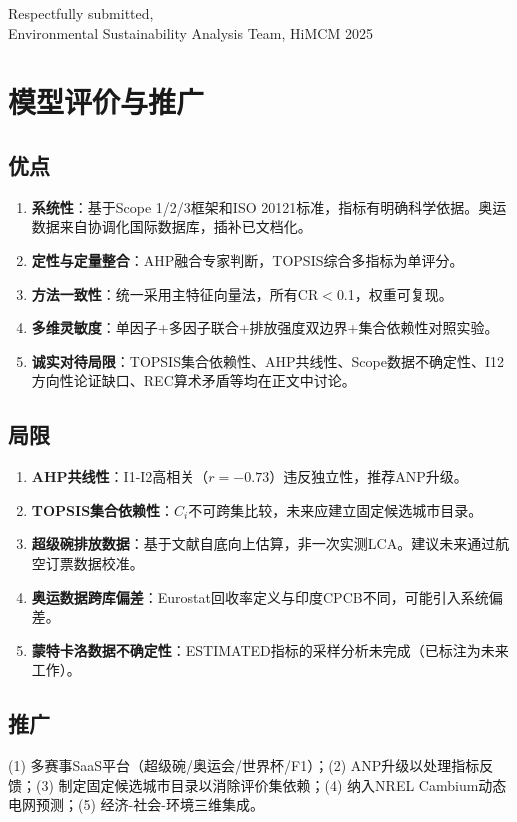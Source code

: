 \documentclass[12pt]{ctexart}
\begin{document}
\vspace{0.8em}
\noindent Respectfully submitted,\\[1em]
\noindent Environmental Sustainability Analysis Team, HiMCM 2025

\section{模型评价与推广}\label{sec:evaluation}

\subsection{优点}
\begin{enumerate}[itemsep=0.2em]
  \item \textbf{系统性}：基于Scope 1/2/3框架和ISO 20121标准\cite{ISO20121}，指标有明确科学依据。奥运数据来自协调化国际数据库，插补已文档化。
  \item \textbf{定性与定量整合}：AHP融合专家判断，TOPSIS综合多指标为单评分。
  \item \textbf{方法一致性}：统一采用主特征向量法，所有CR$<$0.1，权重可复现。
  \item \textbf{多维灵敏度}：单因子+多因子联合+排放强度双边界+集合依赖性对照实验。
  \item \textbf{诚实对待局限}：TOPSIS集合依赖性、AHP共线性、Scope数据不确定性、I12方向性论证缺口、REC算术矛盾等均在正文中讨论。
\end{enumerate}

\subsection{局限}
\begin{enumerate}[itemsep=0.2em]
  \item \textbf{AHP共线性}：I1-I2高相关（$r=-0.73$）违反独立性，推荐ANP升级\cite{Saaty}。
  \item \textbf{TOPSIS集合依赖性}：$C_i$不可跨集比较，未来应建立固定候选城市目录。
  \item \textbf{超级碗排放数据}：基于文献自底向上估算，非一次实测LCA。建议未来通过航空订票数据校准。
  \item \textbf{奥运数据跨库偏差}：Eurostat回收率定义与印度CPCB不同，可能引入系统偏差。
  \item \textbf{蒙特卡洛数据不确定性}：ESTIMATED指标的采样分析未完成（已标注为未来工作）。
\end{enumerate}

\subsection{推广}
(1) 多赛事SaaS平台（超级碗/奥运会/世界杯/F1）；(2) ANP升级以处理指标反馈\cite{Saaty}；(3) 制定固定候选城市目录以消除评价集依赖；(4) 纳入NREL Cambium动态电网预测\cite{EIA}；(5) 经济-社会-环境三维集成。
\end{document}
